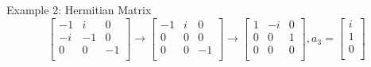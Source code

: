 \documentclass{beamer}
\begin{document}
\begin{frame}{Example 2: Hermitian Matrix}
\begin{equation*}
    \left[ \begin{matrix}
        -1&		i&		0\\
        -i&		-1&		0\\
        0&		0&		-1\\
    \end{matrix} \right] \rightarrow \left[ \begin{matrix}
        -1&		i&		0\\
        0&		0&		0\\
        0&		0&		-1\\
    \end{matrix} \right] \rightarrow \left[ \begin{matrix}
        1&		-i&		0\\
        0&		0&		1\\
        0&		0&		0\\
    \end{matrix} \right] , a_3=\left[ \begin{array}{c}
        i\\
        1\\
        0\\
    \end{array} \right]
\end{equation*}
\end{frame}
\end{document}
